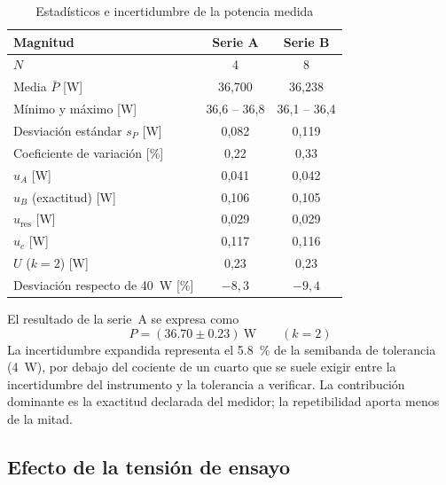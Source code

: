 \begin{table}[htbp]
\centering
\caption{Estadísticos e incertidumbre de la potencia medida}
\label{tab:estadisticos}
\renewcommand{\arraystretch}{1.25}
\begin{tabular}{@{} l c c @{}}
\toprule
\textbf{Magnitud} & \textbf{Serie A} & \textbf{Serie B} \\
\midrule
$N$                                            & 4       & 8 \\
Media $\bar{P}$ [\si{\watt}]                   & 36,700  & 36,238 \\
Mínimo y máximo [\si{\watt}]                   & 36,6 -- 36,8 & 36,1 -- 36,4 \\
Desviación estándar $s_P$ [\si{\watt}]         & 0,082   & 0,119 \\
Coeficiente de variación [\si{\percent}]       & 0,22    & 0,33 \\
$u_A$ [\si{\watt}]                             & 0,041   & 0,042 \\
$u_B$ (exactitud) [\si{\watt}]                 & 0,106   & 0,105 \\
$u_{\mathrm{res}}$ [\si{\watt}]                & 0,029   & 0,029 \\
$u_c$ [\si{\watt}]                             & 0,117   & 0,116 \\
$U$ ($k = 2$) [\si{\watt}]                     & 0,23    & 0,23 \\
Desviación respecto de \SI{40}{\watt} [\si{\percent}] & $-8{,}3$ & $-9{,}4$ \\
\bottomrule
\end{tabular}
\end{table}

El resultado de la serie~A se expresa como
\begin{equation}
    P = (\num{36,70} \pm \num{0,23})~\si{\watt} \qquad (k = 2)
    \label{eq:resultado_final}
\end{equation}
La incertidumbre expandida representa el \SI{5,8}{\percent} de la semibanda de
tolerancia (\SI{4}{\watt}), por debajo del cociente de un cuarto que se suele
exigir entre la incertidumbre del instrumento y la tolerancia a verificar. La
contribución dominante es la exactitud declarada del medidor; la repetibilidad
aporta menos de la mitad.

\subsection{Efecto de la tensión de ensayo}

